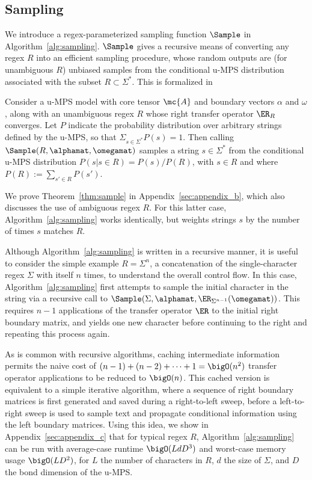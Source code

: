 \subsection{Sampling}

We introduce a regex-parameterized sampling function $\Sample$ in Algorithm~\ref{alg:sampling}. $\Sample$ gives a recursive means of converting any regex $R$ into an efficient sampling procedure, whose random outputs are (for unambiguous $R$) unbiased samples from the conditional u-MPS distribution associated with the subset $R \subset \Sigma^*$. This is formalized in
%
\begin{theorem}
\label{thm:sample}
Consider a u-MPS model with core tensor $\mc{A}$ and boundary vectors $\alpha$ and $\omega$, along with an unambiguous regex $R$ whose right transfer operator $\ER_R$ converges. Let $P$ indicate the probability distribution over arbitrary strings defined by the u-MPS, so that $\Sigma_{s\in\Sigma^*} P(s) = 1$. Then calling $\Sample(R, \alphamat, \omegamat)$ samples a string $s \in \Sigma^*$ from the conditional u-MPS distribution $P(s | s \in R) = P(s) / P(R)$, with $s \in R$ and where $P(R) := \sum_{s' \in R} P(s')$.
\end{theorem}
%
We prove Theorem~\ref{thm:sample} in Appendix~\ref{sec:appendix_b}, which also discusses the use of ambiguous regex $R$. For this latter case, Algorithm~\ref{alg:sampling} works identically, but weights strings $s$ by the number of times $s$ matches $R$.

Although Algorithm~\ref{alg:sampling} is written in a recursive manner, it is useful to consider the simple example $R = \Sigma^n$, a concatenation of the single-character regex $\Sigma$ with itself $n$ times, to understand the overall control flow. In this case, Algorithm~\ref{alg:sampling} first attempts to sample the initial character in the string via a recursive call to $\Sample(\Sigma, \alphamat, \ER_{\Sigma^{n-1}}(\omegamat))$. This requires $n-1$ applications of the transfer operator $\ER$ to the initial right boundary matrix, and yields one new character before continuing to the right and repeating this process again.

As is common with recursive algorithms, caching intermediate information permits the naive cost of $(n-1) + (n-2) + \cdots + 1 = \bigO(n^2)$ transfer operator applications to be reduced to $\bigO(n)$. This cached version is equivalent to a simple iterative algorithm, where a sequence of right boundary matrices is first generated and saved during a right-to-left sweep, before a left-to-right sweep is used to sample text and propagate conditional information using the left boundary matrices. Using this idea, we show in Appendix~\ref{sec:appendix_c} that for typical regex $R$, Algorithm~\ref{alg:sampling} can be run with average-case runtime $\bigO(L d D^3)$ and worst-case memory usage $\bigO(L D^2)$, for $L$ the number of characters in $R$, $d$ the size of $\Sigma$, and $D$ the bond dimension of the u-MPS.

